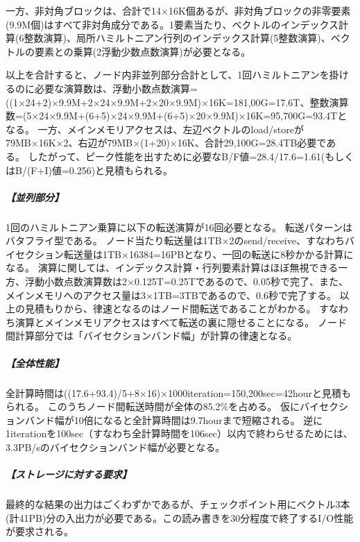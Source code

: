 一方、非対角ブロックは、合計で14×16K個あるが、非対角ブロックの非零要素(9.9M個)はすべて非対角成分である。1要素当たり、ベクトルのインデックス計算(6整数演算)、局所ハミルトニアン行列のインデックス計算(5整数演算)、ベクトルの要素との乗算(2浮動少数点数演算)が必要となる。

以上を合計すると、ノード内非並列部分合計として、1回ハミルトニアンを掛けるのに必要な演算数は、浮動小数点数演算=((1×24+2)×9.9M+2×24×9.9M+2×20×9.9M)×16K=181,00G=17.6T、整数演算数=(5×24×9.9M+(6+5)×24×9.9M+(6+5)×20×9.9M)×16K=95,700G=93.4Tとなる。
一方、メインメモリアクセスは、左辺ベクトルのload/storeが79MB×16K×2、右辺が79MB×(1+20)×16K、合計29,100G=28.4TB必要である。
したがって、ピーク性能を出すために必要なB/F値=28.4/17.6=1.61(もしくはB/(F+I)値=0.256)と見積もられる。

\subparagraph{【並列部分】}
1回のハミルトニアン乗算に以下の転送演算が16回必要となる。
転送パターンはバタフライ型である。
ノード当たり転送量は1TB×2のsend/receive、すなわちバイセクション転送量は1TB×16384=16PBとなり、一回の転送に8秒かかる計算になる。
演算に関しては、インデックス計算・行列要素計算はほぼ無視できる一方、浮動小数点数演算数は2×0.125T=0.25Tであるので、0.05秒で完了、また、メインメモリへのアクセス量は3×1TB=3TBであるので、0.6秒で完了する。
以上の見積もりから、律速となるのはノード間転送であることがわかる。
すなわち演算とメインメモリアクセスはすべて転送の裏に隠せることになる。
ノード間計算部分では「バイセクションバンド幅」が計算の律速となる。

\subparagraph{【全体性能】}
全計算時間は((17.6+93.4)/5+8×16)×1000iteration=150,200sec=42hourと見積もられる。
このうちノード間転送時間が全体の85.2\%を占める。
仮にバイセクションバンド幅が10倍になると全計算時間は9.7hourまで短縮される。
逆に1iterationを100sec（すなわち全計算時間を106sec）以内で終わらせるためには、3.3PB/sのバイセクションバンド幅が必要となる。

\subparagraph{【ストレージに対する要求】}
最終的な結果の出力はごくわずかであるが、チェックポイント用にベクトル3本(計41PB)分の入出力が必要である。この読み書きを30分程度で終了するI/O性能が要求される。


